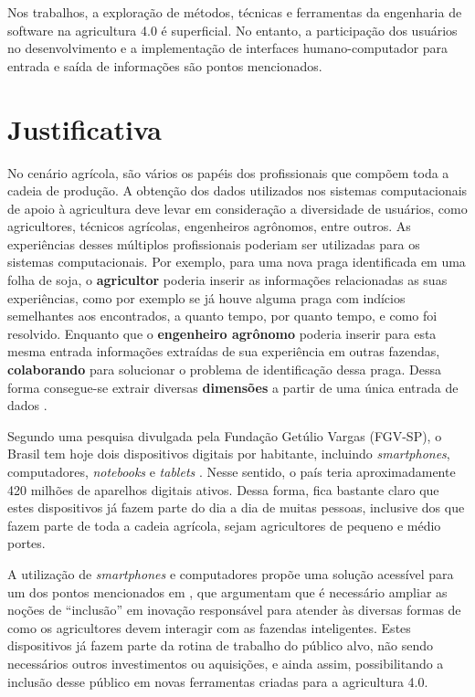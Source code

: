 \documentclass[12pt]{article}
\begin{document}
Nos trabalhos, a exploração de métodos, técnicas e ferramentas da engenharia de software na agricultura 4.0 é superficial. No entanto, a participação dos usuários no desenvolvimento e a implementação de interfaces humano-computador para entrada e saída de informações são pontos mencionados.

\section{Justificativa}
\label{sec:justificativa}

No cenário agrícola, são vários os papéis dos profissionais que compõem toda a cadeia de produção. A obtenção dos dados utilizados nos sistemas computacionais de apoio à agricultura deve levar em consideração a diversidade de usuários, como agricultores, técnicos agrícolas, engenheiros agrônomos, entre outros. As experiências desses múltiplos profissionais poderiam ser utilizadas para os sistemas computacionais. Por exemplo, para uma nova praga identificada em uma folha de soja, o \textbf{agricultor} poderia inserir as informações relacionadas as suas experiências, como por exemplo se já houve alguma praga com indícios semelhantes aos encontrados, a quanto tempo, por quanto tempo, e como foi resolvido. Enquanto que o \textbf{engenheiro agrônomo} poderia inserir para esta mesma entrada informações extraídas de sua experiência em outras fazendas, \textbf{colaborando} para solucionar o problema de identificação dessa praga. Dessa forma consegue-se extrair diversas \textbf{dimensões} a partir de uma única entrada de dados \cite{Walling:2020}.

Segundo uma pesquisa divulgada pela Fundação Getúlio Vargas (FGV-SP), o Brasil tem hoje dois dispositivos digitais por habitante, incluindo \textit{smartphones}, computadores, \textit{notebooks} e \textit{tablets} \cite{FGV:2020}. Nesse sentido, o país teria aproximadamente 420 milhões de aparelhos digitais ativos. Dessa forma, fica bastante claro que estes dispositivos já fazem parte do dia a dia de muitas pessoas, inclusive dos que fazem parte de toda a cadeia agrícola, sejam agricultores de pequeno e médio portes.

A utilização de \textit{smartphones} e computadores propõe uma solução acessível para um dos pontos mencionados em , que argumentam que é necessário ampliar as noções de ``inclusão'' em inovação responsável para atender às diversas formas de como os agricultores devem interagir com as fazendas inteligentes. Estes dispositivos já fazem parte da rotina de trabalho do público alvo, não sendo necessários outros investimentos ou aquisições, e ainda assim, possibilitando a inclusão desse público em novas ferramentas criadas para a agricultura 4.0.
\end{document}

